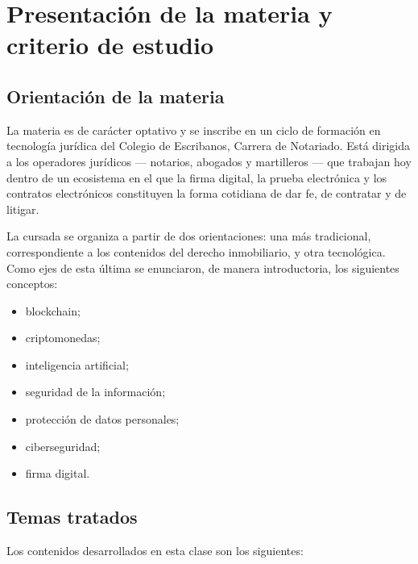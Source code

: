 \documentclass[12pt,oneside]{book}
\begin{document}
\chapter[Presentación]{Presentación de la materia y criterio de estudio}
\label{cap:presentacion}

\section{Orientación de la materia}

La materia es de carácter optativo y se inscribe en un ciclo de formación en tecnología jurídica del Colegio de Escribanos, Carrera de Notariado. Está dirigida a los operadores jurídicos --- notarios, abogados y martilleros --- que trabajan hoy dentro de un ecosistema en el que la firma digital, la prueba electrónica y los contratos electrónicos constituyen la forma cotidiana de dar fe, de contratar y de litigar.

La cursada se organiza a partir de dos orientaciones: una más tradicional, correspondiente a los contenidos del derecho inmobiliario, y otra tecnológica. Como ejes de esta última se enunciaron, de manera introductoria, los siguientes conceptos:

\begin{itemize}
    \item blockchain;
    \item criptomonedas;
    \item inteligencia artificial;
    \item seguridad de la información;
    \item protección de datos personales;
    \item ciberseguridad;
    \item firma digital.
\end{itemize}

\section{Temas tratados}

Los contenidos desarrollados en esta clase son los siguientes:
\end{document}
